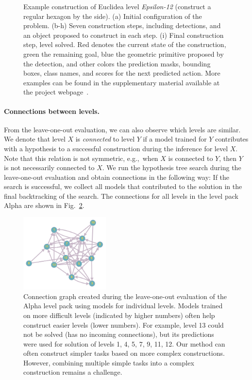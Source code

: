 \begin{figure}[!h]
        \caption{Example construction of Euclidea level \textit{Epsilon-12} (construct a regular hexagon by the side).
        (a) Initial configuration of the problem.
        (b-h) Seven construction steps, including \maskrcnn detections, and an object proposed to construct in each step.
        (i) Final construction step, level solved.
        Red denotes the current state of the construction, green the remaining goal,
        blue the geometric primitive proposed by the detection,
        and other colors
        the prediction masks, bounding boxes, class names, and scores for the next predicted action.
        More examples can be found in the supplementary material available at the project webpage~\cite{project-page}.
        }
        \label{fig:Epsilon12_example}
\end{figure}

\paragraph{\textbf{Connections between levels.}}
\label{connections}
From the leave-one-out evaluation, we can also observe which levels are similar.
We denote that level $X$ is \emph{connected} to level $Y$ if a model trained for $Y$ contributes with a hypothesis to a successful construction during the inference for level $X$.
Note that this relation is not symmetric, e.g.,~when $X$ is connected to $Y$, then $Y$ is not necessarily connected to $X$.
We run the hypothesis tree search during the leave-one-out evaluation and obtain connections in the following way: If the search is successful, we collect all models that contributed to the solution in the final backtracking of the search.
The connections for all levels in the level pack Alpha are shown in Fig.~\ref{connection_graph}.



\begin{figure}[htb!]
    \centering
    \includegraphics[width=0.4\textwidth]{img/connection_graph.png}
    \caption{
    \small Connection graph created during the leave-one-out evaluation of the Alpha level pack using models for individual levels. Models trained on 
    more difficult levels (indicated by higher numbers) often help construct easier levels (lower numbers). For example, level 13 could not be solved (has no incoming connections), but its predictions were used for solution of levels 1, 4, 5, 7, 9, 11, 12. Our method can often construct simpler tasks based on more complex constructions. However, combining multiple simple tasks into a complex construction remains a challenge.
    }
    \label{connection_graph}
\end{figure}

